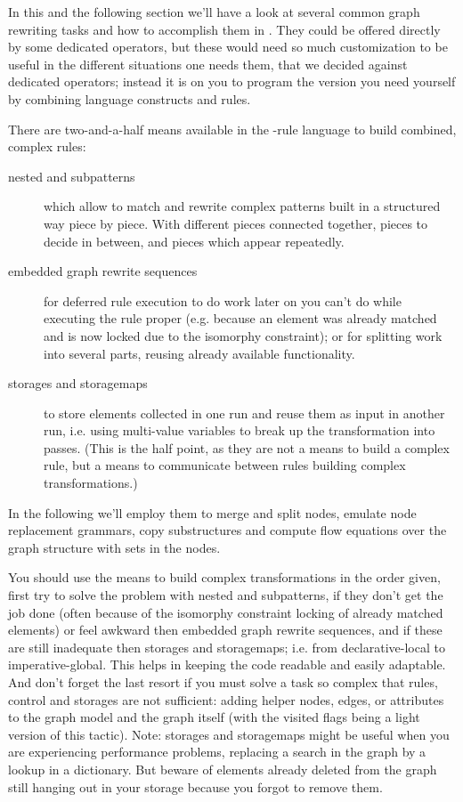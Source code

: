In this and the following section we'll have a look at several common graph rewriting tasks and how to accomplish them in \GrG.
They could be offered directly by some dedicated operators,
but these would need so much customization to be useful in the different situations one needs them,
that we decided against dedicated operators; 
instead it is on you to program the version you need yourself by combining language constructs and rules.

There are two-and-a-half means available in the \GrG-rule language to build combined, complex rules:
\begin{description}
	\item[nested and subpatterns]
which allow to match and rewrite complex patterns built in a structured way piece by piece.
With different pieces connected together, pieces to decide in between, and pieces which appear repeatedly. 
	\item[embedded graph rewrite sequences]
for deferred rule execution to do work later on you can't do while executing the rule proper (e.g. because an element was already matched and is now locked due to the isomorphy constraint); or for splitting work into several parts, reusing already available functionality.
	\item[storages and storagemaps]
to store elements collected in one run and reuse them as input in another run, i.e. using multi-value variables to break up the transformation into passes. (This is the half point, as they are not a means to build a complex rule, but a means to communicate between rules building complex transformations.)
\end{description}

\noindent In the following we'll employ them to merge and split nodes, emulate node replacement grammars, copy substructures and compute flow equations over the graph structure with sets in the nodes.

\begin{note}
You should use the means to build complex transformations in the order given, first try to solve the problem with nested and subpatterns, if they don't get the job done (often because of the isomorphy constraint locking of already matched elements) or feel awkward then embedded graph rewrite sequences, and if these are still inadequate then storages and storagemaps; i.e. from declarative-local to imperative-global. This helps in keeping the code readable and easily adaptable. And don't forget the last resort if you must solve a task so complex that rules, control and storages are not sufficient: adding helper nodes, edges, or attributes to the graph model and the graph itself (with the visited flags being a light version of this tactic). Note: storages and storagemaps might be useful when you are experiencing performance problems, replacing a search in the graph by a lookup in a dictionary. But beware of elements already deleted from the graph still hanging out in your storage because you forgot to remove them.
\end{note}

